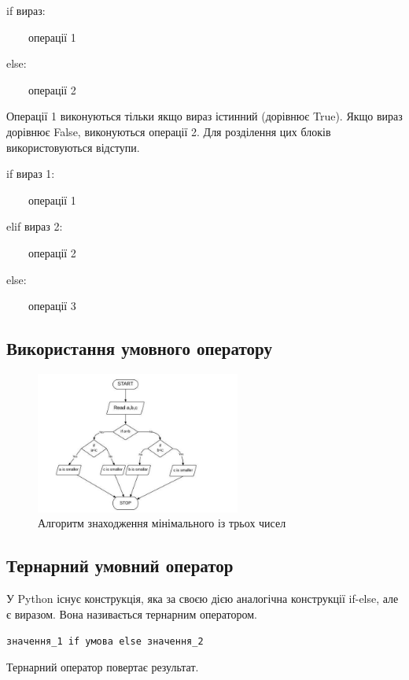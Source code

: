\begin{frame}
\huge{if вираз:

~~~~операції 1

else:

~~~~операції 2}


\begin{flushleft}
\normalsize
Операції 1 виконуються тільки якщо вираз істинний (дорівнює True). Якщо вираз дорівнює False, виконуються операції 2. Для розділення цих блоків використовуються відступи.
\end{flushleft}
\end{frame}


\begin{frame}
\huge{if вираз 1:

~~~~операції 1

elif вираз 2:

~~~~операції 2

else:

~~~~операції 3}

\end{frame}

 \subsection{Використання умовного оператору} 
\begin{frame}
\begin{figure}
\begin{center}
 \includegraphics[width=0.6\textwidth]{pictures/find_min.jpg}
\caption{Алгоритм знаходження мінімального із трьох чисел}
\label{find_min} 
\end{center}
\end{figure}
\end{frame}

 \subsection{Тернарний умовний оператор} 
\begin{frame}
У Python існує конструкція, яка за своєю дією аналогічна конструкції if-else, але є виразом. Вона називається тернарним оператором.

\Large{\texttt{значення\_1 if умова else значення\_2}}

Тернарний оператор повертає результат.
\end{frame}
